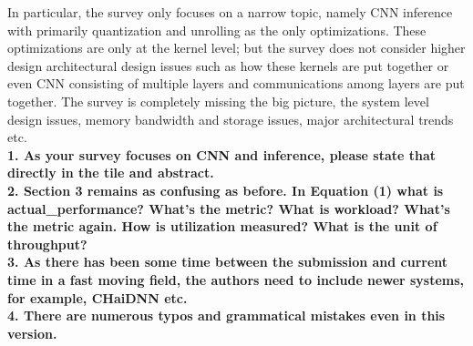 \documentclass[12pt]{paper}
\newcommand{\comment}[1]{\noindent\textbf{#1}\\}
\begin{document}
In particular, the survey only focuses on a narrow topic, namely CNN inference with primarily quantization and unrolling as the only optimizations. These optimizations are only at the kernel level; but the survey does not consider higher design architectural design issues such as how these kernels are put together or even CNN consisting of multiple layers and communications among layers are put together. The survey is completely missing the big picture, the system level design issues, memory bandwidth and storage issues, major architectural trends etc.\\

\comment{1. As your survey focuses on CNN and inference, please state that directly in the tile and abstract.}

\comment{2. Section 3 remains as confusing as before. In Equation (1) what is actual\_performance? What's the metric? What is workload? What's the metric again. How is utilization measured? What is the unit of throughput?}

\comment{3. As there has been some time between the submission and current time in a fast moving field, the authors need to include newer systems, for example, CHaiDNN etc.}

\comment{4. There are numerous typos and grammatical mistakes even in this version.}
\end{document}
